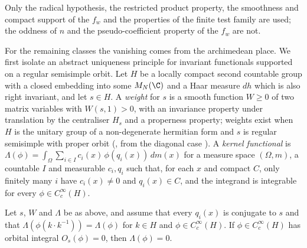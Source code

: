 Only the radical hypothesis, the restricted product property, the smoothness and compact support of the $f_w$ and the
properties of the finite test family are used; the oddness of $n$ and the pseudo-coefficient property of the $f_w$ are not.

For the remaining classes the vanishing comes from the archimedean place. We first isolate an abstract uniqueness
principle for invariant functionals supported on a regular semisimple orbit. Let $H$ be a locally compact second
countable group with a closed embedding into some $M_N(\C)$ and a Haar measure $dh$ which is also right invariant, and
let $s\in H$. A \emph{weight} for $s$ is a smooth function $W\ge0$ of two matrix variables with $W(s,1)>0$, with an
invariance property under translation by the centraliser $H_s$ and a properness property; weights exist when $H$ is the
unitary group of a non-degenerate hermitian form and $s$ is regular semisimple with proper orbit
(, from the diagonal case
). A \emph{kernel functional} is $\Lambda(\phi)=\int_\Omega\sum_{i\in I}
c_i(x)\,\phi(q_i(x))\,dm(x)$ for a measure space $(\Omega,m)$, a countable $I$ and measurable $c_i,q_i$ such that, for each
$x$ and compact $C$, only finitely many $i$ have $c_i(x)\ne0$ and $q_i(x)\in C$, and the integrand is integrable for every
$\phi\in C_c^\infty(H)$.

\begin{lemma}\label{pf:multnc:vanish}
Let $s$, $W$ and $\Lambda$ be as above, and assume that every $q_i(x)$ is conjugate to $s$ and that
$\Lambda(\phi(k\cdot k^{-1}))=\Lambda(\phi)$ for $k\in H$ and $\phi\in C_c^\infty(H)$. If $\phi\in C_c^\infty(H)$ has orbital
integral $O_s(\phi)=0$, then $\Lambda(\phi)=0$.
\end{lemma}

